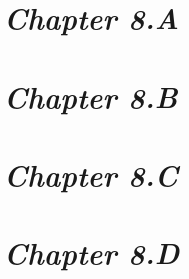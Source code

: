 \documentclass[a4paper,12pt]{article}
\begin{document}
    \newpage

    \section{\large \textit{Chapter 8.A}}

    

    \newpage

    \section{\large \textit{Chapter 8.B}}

    

    \newpage

    \section{\large \textit{Chapter 8.C}}

    

    \newpage

    \section{\large \textit{Chapter 8.D}}

    
\end{document}

